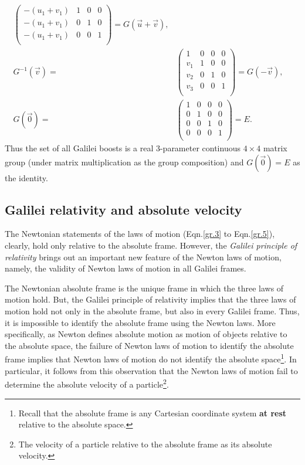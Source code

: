 \begin{small}
\begin{align}
\begin{pmatrix}
-(u_1+v_1)&1&0&0\\
-(u_1+v_1)&0&1&0\\
-(u_1+v_1)&0&0&1\\
\end{pmatrix}
={ G(\vec{u}+\vec{v})},\\
{G}^{-1}(\vec{v})=&
\begin{pmatrix} 1&0&0&0\\
v_1&1&0&0\\
v_2&0&1&0\\
v_3&0&0&1\\
\end{pmatrix}={G}(-\vec{v}), \quad \\
{G}(\vec{0})=&
\begin{pmatrix} 1&0&0&0\\
0&1&0&0\\
0&0&1&0\\
0&0&0&1\\
\end{pmatrix}={E}.
\end{align}
Thus the set of all Galilei boosts is a real 3-parameter
continuous $4\times 4$ matrix group (under matrix
multiplication as the group composition) and ${G}
(\vec{0})= {E}$ as the identity.\ebx
 \end{small}
 
 \vspace{-.2cm}
 
 \subsection{Galilei relativity and absolute
velocity}
The Newtonian statements of the laws of motion 
(Eqn.\eqref{gr.3} to Eqn.\eqref{gr.5}), clearly, hold only 
relative to the absolute frame. However, the 
\textsl{Galilei principle of relativity} brings out an 
important new feature of the Newton laws of motion, namely, 
the validity of Newton laws of motion in all Galilei frames.

The Newtonian absolute frame is the unique 
frame in which the three laws of motion hold. But, the 
Galilei principle of relativity implies that the three laws 
of motion hold not only in the absolute frame, but also 
in every Galilei frame. Thus, it is impossible to 
identify the absolute frame using the Newton laws. More 
specifically, as Newton defines absolute motion as motion of 
objects relative to the absolute space, the failure of 
Newton laws of motion to identify the absolute frame implies 
that Newton laws of motion do not identify the absolute 
space\footnote{Recall that the absolute frame is any 
Cartesian coordinate system \textbf{at  rest} relative to 
the absolute space.}. In particular, it follows from this 
observation that the Newton laws of motion fail to determine 
the absolute velocity of a particle\footnote{The velocity of 
a particle relative to the absolute frame as its absolute 
velocity.}.


